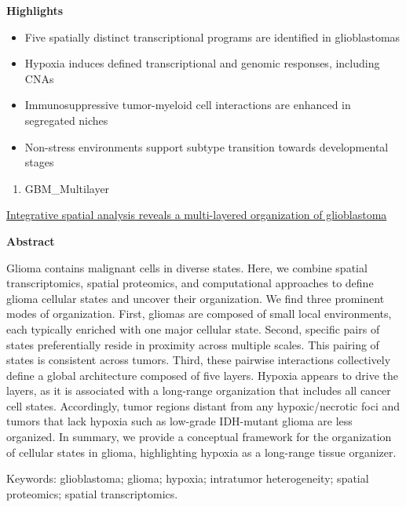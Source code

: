 \documentclass[
]{book}
\providecommand{\tightlist}{%
  \setlength{\itemsep}{0pt}\setlength{\parskip}{0pt}}
\begin{document}
\textbf{Highlights}

\begin{itemize}
\item
  Five spatially distinct transcriptional programs are identified in glioblastomas
\item
  Hypoxia induces defined transcriptional and genomic responses, including CNAs
\item
  Immunosuppressive tumor-myeloid cell interactions are enhanced in segregated niches
\item
  Non-stress environments support subtype transition towards developmental stages
\end{itemize}

\begin{enumerate}
\def\labelenumi{\arabic{enumi}.}
\setcounter{enumi}{2}
\tightlist
\item
  GBM\_Multilayer
\end{enumerate}

\href{https://www.cell.com/cell/fulltext/S0092-8674(24)00320-9?_returnURL=https\%3A\%2F\%2Flinkinghub.elsevier.com\%2Fretrieve\%2Fpii\%2FS0092867424003209\%3Fshowall\%3Dtrue}{Integrative spatial analysis reveals a multi-layered organization of glioblastoma}

\textbf{Abstract}

Glioma contains malignant cells in diverse states. Here, we combine spatial transcriptomics, spatial proteomics, and computational approaches to define glioma cellular states and uncover their organization. We find three prominent modes of organization. First, gliomas are composed of small local environments, each typically enriched with one major cellular state. Second, specific pairs of states preferentially reside in proximity across multiple scales. This pairing of states is consistent across tumors. Third, these pairwise interactions collectively define a global architecture composed of five layers. Hypoxia appears to drive the layers, as it is associated with a long-range organization that includes all cancer cell states. Accordingly, tumor regions distant from any hypoxic/necrotic foci and tumors that lack hypoxia such as low-grade IDH-mutant glioma are less organized. In summary, we provide a conceptual framework for the organization of cellular states in glioma, highlighting hypoxia as a long-range tissue organizer.\citep{greenwald2024integrative}

Keywords: glioblastoma; glioma; hypoxia; intratumor heterogeneity; spatial proteomics; spatial transcriptomics.
\end{document}
